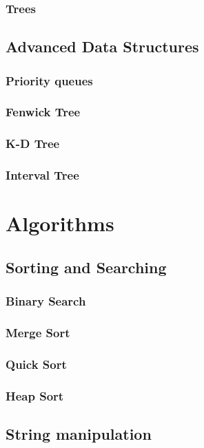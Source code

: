 \documentclass[10pt,landscape,twocolumn]{article}
\begin{document}
\subsubsection{Trees}

\subsection{Advanced Data Structures}

\subsubsection{Priority queues}
\subsubsection{Fenwick Tree}
\subsubsection{K-D Tree}
\subsubsection{Interval Tree}

\section{Algorithms}

\subsection{Sorting and Searching}

\subsubsection{Binary Search}
\subsubsection{Merge Sort}
\subsubsection{Quick Sort}
\subsubsection{Heap Sort}

\subsection{String manipulation}
\end{document}
